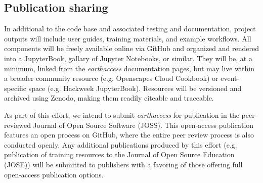 


\subsection{Publication sharing}

In additional to the code base and associated testing and documentation, project outputs will include user guides, training materials, and example workflows. All components will be freely available online via GitHub and organized and rendered into a JupyterBook, gallary of Jupyter Notebooks, or similar. They will be, at a minimum, linked from the \textit{earthaccess} documentation pages, but may live within a broader community resource (e.g. Openscapes Cloud Cookbook) or event-specific space (e.g. Hackweek JupyterBook). Resources will be versioned and archived using Zenodo, making them readily citeable and traceable.

As part of this effort, we intend to submit \textit{earthaccess} for publication in the peer-reviewed Journal of Open Source Software (JOSS). This open-access publication features an open process on GitHub, where the entire peer review process is also conducted openly. Any additional publications produced by this effort (e.g. publication of training resources to the Journal of Open Source Education (JOSE)) will be submitted to publishers with a favoring of those offering full open-access publication options.



